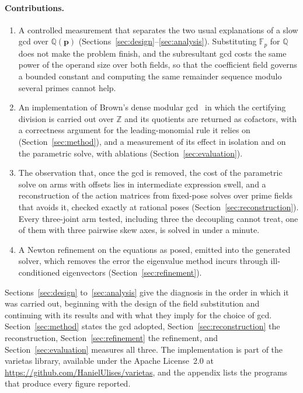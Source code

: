 \documentclass[11pt,a4paper]{article}
\theoremstyle{plain}
\theoremstyle{definition}
\theoremstyle{remark}
\newcommand{\FF}{\mathbb{F}}
\newcommand{\QQ}{\mathbb{Q}}
\newcommand{\bp}{\boldsymbol{p}}
\begin{document}
\paragraph{Contributions.}
\begin{enumerate}
\item A controlled measurement that separates the two usual explanations of a slow gcd over
  $\QQ(\bp)$ (Sections~\ref{sec:design}--\ref{sec:analysis}). Substituting $\FF_p$ for $\QQ$ does not
  make the problem finish, and the subresultant gcd costs the same power of the operand size over both
  fields, so that the coefficient field governs a bounded constant and computing the same remainder
  sequence modulo several primes cannot help.
\item An implementation of Brown's dense modular gcd~\cite{brown1971} in which the certifying division
  is carried out over $\mathbb{Z}$ and its quotients are returned as cofactors, with a correctness
  argument for the leading-monomial rule it relies on (Section~\ref{sec:method}), and a measurement of
  its effect in isolation and on the parametric solve, with ablations (Section~\ref{sec:evaluation}).
\item The observation that, once the gcd is removed, the cost of the parametric solve on arms with
  offsets lies in intermediate expression swell, and a reconstruction of the action matrices from
  fixed-pose solves over prime fields~\cite{kaltofen1990,vonmanteuffel2015,peraro2016} that avoids it,
  checked exactly at rational poses (Section~\ref{sec:reconstruction}). Every three-joint arm tested,
  including three the decoupling cannot treat, one of them with three pairwise skew axes, is solved
  in under a minute.
\item A Newton refinement on the equations as posed, emitted into the generated solver, which removes
  the error the eigenvalue method incurs through ill-conditioned eigenvectors
  (Section~\ref{sec:refinement}).
\end{enumerate}

Sections~\ref{sec:design} to~\ref{sec:analysis} give the diagnosis in the order in which it was
carried out, beginning with the design of the field substitution and continuing with its results and
with what they imply for the choice of gcd. Section~\ref{sec:method} states the gcd adopted, Section~\ref{sec:reconstruction} the
reconstruction, Section~\ref{sec:refinement} the refinement, and Section~\ref{sec:evaluation}
measures all three. The implementation is part of the varietas library, available under the Apache
License~2.0 at \url{https://github.com/HanielUlises/varietas}, and the appendix lists the programs that
produce every figure reported.
\end{document}
